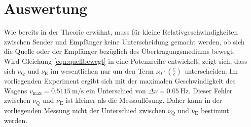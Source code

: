 \section{Auswertung}
\label{sec:Auswertung}
\FloatBarrier
Wie bereits in der Theorie erwähnt, muss für kleine Relativgeschwindigkeiten zwischen Sender und Empfänger keine Unterscheidung gemacht werden, ob sich die Quelle oder der Empfänger bezüglich des Übertragungsmediums bewegt.
Wird Gleichung \eqref{eqn:quellbewegt} in eine Potenzreihe entwickelt, zeigt sich, dass sich $\nu_{\mathrm{Q}}$ und $\nu_{\mathrm{E}}$ im wesentlichen nur um den Term $\nu_{\mathrm{0}} \cdot \left(\frac{v}{c}\right)$ unterscheiden.
Im vorliegenden Experiment ergibt sich mit der maximalen Geschwindigkeit des Wagens $v_{\mathrm{max}}=\SI{0.5115}{\meter\per\second}$ ein Unterschied von $\Delta \nu=\SI{0.05}{\Hz}$.
Dieser Fehler zwischen $\nu_{\mathrm{Q}}$ und $\nu_{\mathrm{E}}$ ist kleiner als die Messauflösung. Daher kann in der vorliegenden Messung nicht der Unterschied zwischen $\nu_{\mathrm{Q}}$ und $\nu_{\mathrm{E}}$ bestimmt werden.

